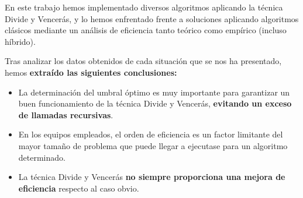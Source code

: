 En este trabajo hemos implementado diversos algoritmos aplicando
la técnica Divide y Vencerás, y lo hemos enfrentado frente a soluciones aplicando
algoritmos clásicos mediante un análisis de eficiencia tanto teórico como empírico 
(incluso híbrido). 

Tras analizar los datos obtenidos de cada situación que se nos ha presentado,
hemos \textbf{extraído las siguientes conclusiones: }

\begin{itemize}
    \item La determinación del umbral óptimo es muy importante para garantizar un buen funcionamiento
    de la técnica Divide y Vencerás, \textbf{evitando un exceso de llamadas recursivas}.
    \item En los equipos empleados, el orden de eficiencia es un factor limitante del mayor tamaño de 
    problema que puede llegar a ejecutase para un algoritmo determinado.
    \item La técnica Divide y Vencerás \textbf{no siempre proporciona una mejora de eficiencia}
    respecto al caso obvio. 
    
\end{itemize}